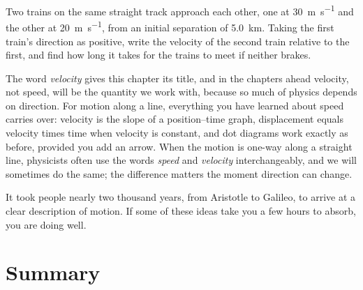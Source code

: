 \documentclass[11pt,twoside,openany]{book}
\newcounter{check}[chapter]
\begin{document}
\begin{checkbox}
Two trains on the same straight track approach each other, one at \SI{30}{\metre\per\second} and the other at \SI{20}{\metre\per\second}, from an initial separation of \SI{5.0}{\kilo\metre}. Taking the first train's direction as positive, write the velocity of the second train relative to the first, and find how long it takes for the trains to meet if neither brakes.
\end{checkbox}

The word \emph{velocity} gives this chapter its title, and in the chapters ahead velocity, not speed, will be the quantity we work with, because so much of physics depends on direction. For motion along a line, everything you have learned about speed carries over: velocity is the slope of a position--time graph, displacement equals velocity times time when velocity is constant, and dot diagrams work exactly as before, provided you add an arrow. When the motion is one-way along a straight line, physicists often use the words \emph{speed} and \emph{velocity} interchangeably, and we will sometimes do the same; the difference matters the moment direction can change.

It took people nearly two thousand years, from Aristotle to Galileo, to arrive at a clear description of motion. If some of these ideas take you a few hours to absorb, you are doing well.

\section{Summary}
\end{document}
